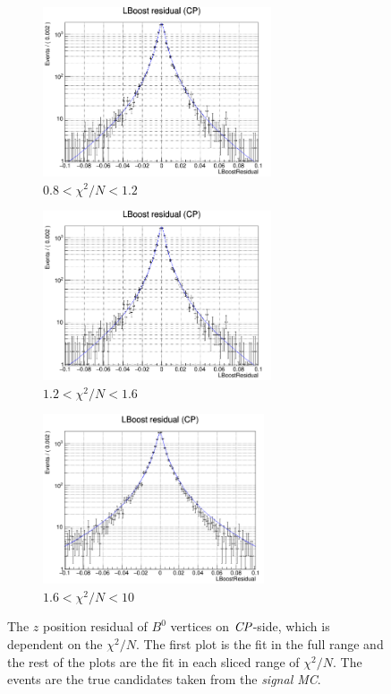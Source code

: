 \begin{figure}[htbp]
\begin{subfigure}{0.5\linewidth}
	\end{subfigure}
	\begin{subfigure}{0.5\linewidth}
		\caption{$0.8<\chi^2/N<1.2$}
		\includegraphics[height=5cm]{figures/residual0.8_1.2}
	\end{subfigure}
	
	\begin{subfigure}{0.5\linewidth}
		\caption{$1.2<\chi^2/N<1.6$}
		\includegraphics[height=5cm]{figures/residual1.2_1.6}
	\end{subfigure}
	\begin{subfigure}{0.5\linewidth}
		\caption{$1.6<\chi^2/N<10$}
		\includegraphics[height=5cm]{figures/residual1.6_10}
	\end{subfigure}
	\caption{ The $z$ position residual of $B^0$ vertices on $\it{CP}$-side, which is dependent on the $\chi^2/N$. The first plot is the fit in the full range and the rest of the plots are the fit in each sliced range of $\chi^2/N$. The events are the true candidates taken from the \textit{signal MC}.}
	\label{fig:redchi2fit}
\end{figure}

